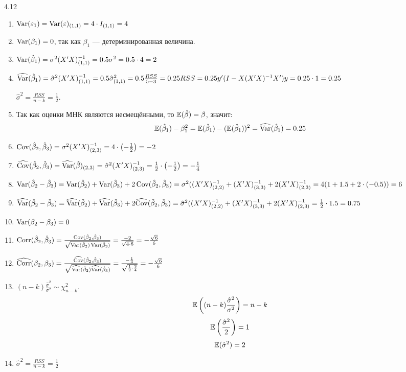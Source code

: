 \begin{solution}{{4.12}}
\begin{enumerate}
\item $\operatorname{Var}(\varepsilon_1)=\operatorname{Var}(\varepsilon)_{(1,1)}=4\cdot I_{(1,1)}=4$
\item $\operatorname{Var}(\beta_1)=0$, так как $\beta_1$ — детерминированная величина.
\item $\operatorname{Var}(\hat{\beta}_1)=\sigma^2(X'X)^{-1}_{(1,1)}=0.5\sigma^2=0.5\cdot 4=2$
\item $\widehat{\operatorname{Var}}(\hat{\beta}_1)=\hat\sigma^2(X'X)^{-1}_{(1,1)}=0.5\hat\sigma^2_{(1,1)}=0.5\frac{RSS}{5-3}=0.25RSS=0.25y'(I-X(X'X)^{-1}X')y=0.25\cdot 1=0.25$

$\hat\sigma^2=\frac{RSS}{n-k}=\frac12$.

\item Так как оценки МНК являются несмещёнными, то $\mathbb{E}(\hat{\beta})=\beta$, значит:
\[
\mathbb{E}(\hat{\beta}_1)-\beta_1^2=\mathbb{E}(\hat{\beta}_1)-(\mathbb{E}(\hat{\beta}_1))^2=\widehat{\operatorname{Var}}(\hat{\beta}_1)=0.25
\]

\item $\operatorname{Cov}(\hat{\beta}_2,\hat{\beta}_3)=\sigma^2(X'X)^{-1}_{(2,3)}=4\cdot\left(-\frac12\right)=-2$
\item $\widehat{\operatorname{Cov}}(\hat{\beta}_2,\hat{\beta}_3)=\widehat{\operatorname{Var}}(\hat\beta)_{(2,3)}=\hat\sigma^2(X'X)^{-1}_{(2,3)}=\frac{1}{2}\cdot\left(-\frac12\right)=-\frac14$

\item $\operatorname{Var}(\hat{\beta}_2-\hat{\beta}_3)=\operatorname{Var}(\hat{\beta}_2)+\operatorname{Var}(\hat{\beta}_3)+2\operatorname{Cov}(\hat{\beta}_2,\hat{\beta}_3)=\sigma^2((X'X)^{-1}_{(2,2)}+(X'X)^{-1}_{(3,3)}+2(X'X)^{-1}_{(2,3)}=4(1+1.5+2\cdot(-0.5))=6$

\item $\widehat{\operatorname{Var}}(\hat{\beta}_2-\hat{\beta}_3)=\widehat{\operatorname{Var}}(\hat{\beta}_2)+\widehat{\operatorname{Var}}(\hat{\beta}_3)+2\widehat{\operatorname{Cov}}(\hat{\beta}_2,\hat{\beta}_3)=\hat\sigma^2((X'X)^{-1}_{(2,2)}+(X'X)^{-1}_{(3,3)}+2(X'X)^{-1}_{(2,3)}=\frac{1}{2}\cdot1.5=0.75$

\item $\operatorname{Var}(\beta_2-\beta_3)=0$

\item $\operatorname{Corr}(\hat{\beta}_2,\hat{\beta}_3)=\frac{\operatorname{Cov}(\hat{\beta}_2,\hat{\beta}_3)}{\sqrt{\operatorname{Var}(\hat{\beta}_2)\operatorname{Var}(\hat{\beta}_3)}}=\frac{-2}{\sqrt{4\cdot6}}=-\frac{\sqrt6}{6}$

\item $\widehat{\operatorname{Corr}}(\beta_2,\beta_3)=\frac{\widehat{\operatorname{Cov}}(\hat{\beta}_2,\hat{\beta}_3)}{\sqrt{\widehat{\operatorname{Var}}(\hat{\beta}_2)\widehat{\operatorname{Var}}(\hat{\beta}_3)}}=\frac{-\frac14}{\sqrt{\frac12\cdot\frac34}}=-\frac{\sqrt6}{6}$

\item $(n-k)\frac{\hat\sigma^2}{\sigma^2}\sim\chi^2_{n-k}$.
\[
\mathbb{E}\left((n-k)\frac{\hat\sigma^2}{\sigma^2}\right)=n-k
\]
\[
\mathbb{E}\left(\frac{\hat\sigma^2}{2}\right)=1
\]
\[
\mathbb{E}(\hat\sigma^2)=2
\]

\item $\hat\sigma^2=\frac{RSS}{n-k}=\frac12$

\end{enumerate}

\end{solution}
